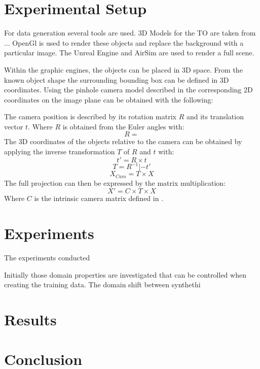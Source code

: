 \section{Experimental Setup}
\label{sec:training:setup}

For data generation several tools are used. 3D Models for the \ac{TO} are taken from ... OpenGl is used to render these objects and replace the background with a particular image. The Unreal Engine and AirSim are used to render a full scene.

Within the graphic engines, the objects can be placed in 3D space. From the known object shape the surrounding bounding box can be defined in 3D coordinates. Using the pinhole camera model described in  the corresponding 2D coordinates on the image plane can be obtained with the following:

The camera position is described by its rotation matrix $R$ and its translation vector $t$. Where $R$ is obtained from the Euler angles with:
$$
R =
$$
The 3D coordinates of the objects relative to the camera can be obtained by applying the inverse transformation $T$ of $R$ and $t$ with:
$$
t' = R \times t
$$
$$
T = R^{-1}|-t'
$$
$$
X_{Cam} = T\times X
$$
The full projection can then be expressed by the matrix multiplication:
$$
X' = C\times T\times X
$$
Where $C$ is the intrinsic camera matrix defined in .



\section{Experiments}
\label{sec:training:experiments}


The experiments conducted

Initially those domain properties are investigated that can be controlled when creating the training data. The domain shift between synthethi







\section{Results}
\label{sec:training:results}

\section{Conclusion}
\label{sec:training:conclusion}

%
